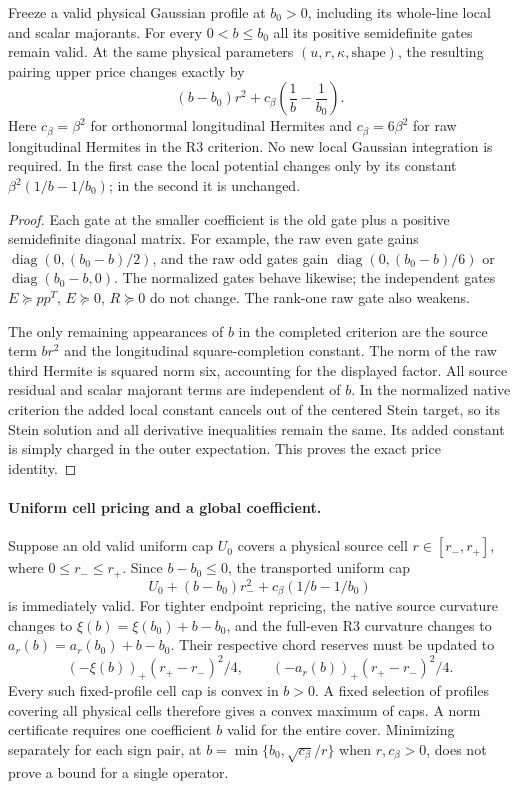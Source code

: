 \begin{proposition}
\label{prop:smaller-b-transport}
Freeze a valid physical Gaussian profile at $b_0>0$, including its
whole-line local and scalar majorants.  For every $0<b\leq b_0$ all
its positive semidefinite gates remain valid.  At the same physical
parameters $(u,r,\kappa,\text{shape})$, the resulting pairing upper
price changes exactly by
\[
 (b-b_0)r^2+c_\beta\left(\frac1b-\frac1{b_0}\right).
\]
Here $c_\beta=\beta^2$ for orthonormal longitudinal Hermites and
$c_\beta=6\beta^2$ for raw longitudinal Hermites in the R3 criterion.
No new local Gaussian integration is required.  In the first case
the local potential changes only by its constant
$\beta^2(1/b-1/b_0)$; in the second it is unchanged.
\end{proposition}
\begin{proof}
Each gate at the smaller coefficient is the old gate plus a positive
semidefinite diagonal matrix.  For example, the raw even gate gains
$\operatorname{diag}(0,(b_0-b)/2)$, and the raw odd gates gain
$\operatorname{diag}(0,(b_0-b)/6)$ or
$\operatorname{diag}(b_0-b,0)$.  The normalized gates behave likewise;
the independent gates $E\succeq pp^T$, $E\succeq0$, $R\succeq0$
do not change.  The rank-one raw gate also weakens.

The only remaining appearances of $b$ in the completed criterion are
the source term $br^2$ and the longitudinal square-completion constant.
The norm of the raw third Hermite is squared norm six, accounting for
the displayed factor.  All source residual and scalar majorant terms
are independent of $b$.  In the normalized native criterion the added
local constant cancels out of the centered Stein target, so its Stein
solution and all derivative inequalities remain the same.  Its added
constant is simply charged in the outer expectation.  This proves the
exact price identity.
\end{proof}

\paragraph{Uniform cell pricing and a global coefficient.}
Suppose an old valid uniform cap $U_0$ covers a physical source cell
$r\in[r_-,r_+]$, where $0\leq r_-\leq r_+$.  Since $b-b_0\leq0$,
the transported uniform cap
\[
 U_0+(b-b_0)r_-^2+c_\beta(1/b-1/b_0)
\]
is immediately valid.  For tighter endpoint repricing, the native
source curvature changes to $\xi(b)=\xi(b_0)+b-b_0$, and the full-even
R3 curvature changes to $a_r(b)=a_r(b_0)+b-b_0$.  Their respective
chord reserves must be updated to
\[
 (-\xi(b))_+(r_+-r_-)^2/4,
 \qquad (-a_r(b))_+(r_+-r_-)^2/4.
\]
Every such fixed-profile cell cap is convex in $b>0$.  A fixed
selection of profiles covering all physical cells therefore gives a
convex maximum of caps.  A norm certificate requires one coefficient
$b$ valid for the entire cover.  Minimizing separately for each sign
pair, at $b=\min\{b_0,\sqrt{c_\beta}/r\}$ when $r,c_\beta>0$,
does not prove a bound for a single operator.
